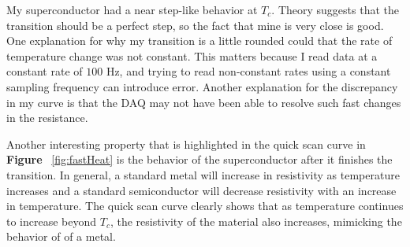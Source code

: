 \documentclass[paper=a4, fontsize=11pt]{scrartcl}
\numberwithin{equation}{section}
\numberwithin{figure}{section}
\numberwithin{table}{section}
\begin{document}
      My superconductor had a near step-like behavior at $T_c$. Theory suggests that the transition should be a perfect step, so the fact that mine is very close is good. One explanation for why my transition is a little rounded could that the rate of temperature change was not constant. This matters because I read data at a constant rate of $100$ Hz, and trying to read non-constant rates using a constant sampling frequency can introduce error. Another explanation for the discrepancy in my curve is that the DAQ may not have been able to resolve such fast changes in the resistance.

      Another interesting property that is highlighted in the quick scan curve in \textbf{Figure} ~\ref{fig:fastHeat} is the behavior of the superconductor after it finishes the transition. In general, a standard metal will increase in resistivity as temperature increases and a standard semiconductor will decrease resistivity with an increase in temperature. The quick scan curve clearly shows that as temperature continues to increase beyond $T_c$, the resistivity of the material also increases, mimicking the behavior of of a metal.


  \clearpage
  \pagestyle{empty}
  

\end{document}
